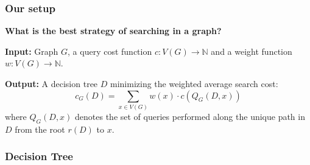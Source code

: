 \documentclass{beamer}
\newcommand{\br}[1]{\mathopen{}\left( #1 \right)}
\begin{document}
\begin{frame}
\frametitle{Our setup}
\textbf{What is the best strategy of searching in a graph?}
\begin{tcolorbox}[colback=white, title=Graph Search Problem (GSP), fonttitle=\bfseries, breakable]
\textbf{Input:} Graph $G$, a query cost function $c\colon V\br{G}\to \mathbb{N}$ and a weight function $w\colon V\br{G}\to \mathbb{N}$.

\pause
\textbf{Output:} A decision tree $D$ minimizing the weighted average search cost: 
$$c_G\br{D} = \sum_{x\in V\br{G}}w\br{x}\cdot c\br{Q_G\br{D, x}}$$
where $Q_G\br{D,x}$ denotes the set of queries performed 
along the unique path in $D$ from the root $r\br{D}$ to $x$.
\end{tcolorbox}
\end{frame}

\begin{frame}\frametitle{Decision Tree}


\end{frame}

\end{document}
